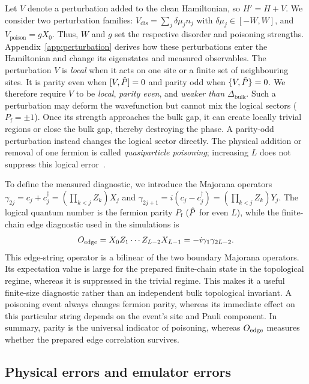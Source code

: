 Let $V$ denote a perturbation added to the clean Hamiltonian, so
$H'=H+V$. We consider two perturbation families:
$V_{\mathrm{dis}}=\sum_j\delta\mu_j n_j$ with
$\delta\mu_j\in[-W,W]$, and $V_{\mathrm{poison}}=gX_0$.
Thus, $W$ and $g$ set the respective disorder and poisoning strengths.
Appendix~\ref{app:perturbation} derives how these perturbations enter the
Hamiltonian and change its eigenstates and measured observables.
The perturbation $V$ is \emph{local} when it acts
on one site or a finite set of neighbouring sites. It is parity even when
$[V,\hat{P}]=0$ and parity odd when $\{V,\hat{P}\}=0$. We therefore require $V$ to be \emph{local}, \emph{parity even}, and \emph{weaker than
$\Delta_{\mathrm{bulk}}$}. Such a perturbation may deform the wavefunction but
cannot mix the logical sectors ($P_{\mathrm f}=\pm1$). Once its strength
approaches the bulk gap, it can create locally trivial regions or close the
bulk gap, thereby destroying the phase. A parity-odd perturbation instead
changes the logical sector directly.
The physical addition or removal of one fermion is called
\emph{quasiparticle poisoning}; increasing $L$ does not suppress this logical
error~\cite{rainis2012}.

To define the measured diagnostic, we introduce the Majorana operators
$\gamma_{2j}=c_j+c_j^\dagger=(\prod_{k<j}Z_k)X_j$ and
$\gamma_{2j+1}=i(c_j-c_j^\dagger)=(\prod_{k<j}Z_k)Y_j$. The logical quantum
number is the fermion parity $P_{\mathrm f}$ ($\hat{P}$ for even $L$), while the
finite-chain edge diagnostic used in the simulations is
\begin{equation}
 O_{\mathrm{edge}}=X_0Z_1\cdots Z_{L-2}X_{L-1}
       =-i\gamma_1\gamma_{2L-2}.
 \label{eq:edge}
\end{equation}
This edge-string operator is a bilinear of the two boundary Majorana operators.
Its expectation value is large for the prepared finite-chain state in the
topological regime, whereas it is suppressed in the trivial regime. This makes
it a useful finite-size diagnostic rather than an independent bulk topological
invariant. A poisoning event always changes fermion parity, whereas
its immediate effect on this particular string depends on the event's site and
Pauli component. In summary, parity is the universal indicator of poisoning,
whereas $O_{\mathrm{edge}}$ measures whether the prepared edge correlation survives.

\subsection{Physical errors and emulator errors}


